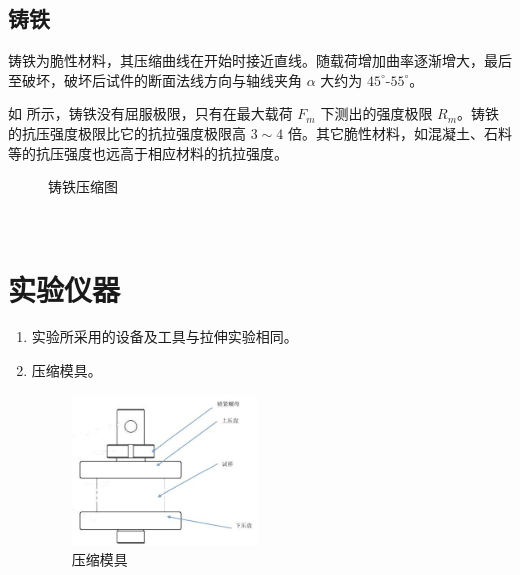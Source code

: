         \subsection{铸铁}
            铸铁为脆性材料，其压缩曲线在开始时接近直线。随载荷增加曲率逐渐增大，最后至破坏，破坏后试件的断面法线方向与轴线夹角 $\alpha$ 大约为 $45^\circ$-$55^\circ$。\par
            如 所示，铸铁没有屈服极限，只有在最大载荷 $F_m$ 下测出的强度极限 $R_m$。铸铁的抗压强度极限比它的抗拉强度极限高 $3\sim4$ 倍。其它脆性材料，如混凝土、石料等的抗压强度也远高于相应材料的抗拉强度。
            \begin{figure}[!ht]
                \hspace{10mm}
                \caption{铸铁压缩图}\label{fig:A6.5a}
            \end{figure}
\
\section{实验仪器}%
    \begin{enumerate}
        \item 实验所采用的设备及工具与拉伸实验相同。
        \item 压缩模具。
        \begin{figure}[!ht]
            \caption{压缩模具}
            \includegraphics[height=40mm]{img/A6/3.jpg}
        \end{figure}
    \end{enumerate}
